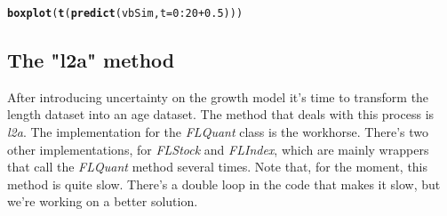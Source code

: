 \documentclass[a4paper,english,10pt]{article}\usepackage[]{graphicx}\usepackage[]{color}
\makeatletter
\newcommand{\hlnum}[1]{\textcolor[rgb]{0.686,0.059,0.569}{#1}}%
\newcommand{\hlopt}[1]{\textcolor[rgb]{0,0,0}{#1}}%
\newcommand{\hlstd}[1]{\textcolor[rgb]{0.345,0.345,0.345}{#1}}%
\newcommand{\hlkwc}[1]{\textcolor[rgb]{0.333,0.667,0.333}{#1}}%
\newcommand{\hlkwd}[1]{\textcolor[rgb]{0.737,0.353,0.396}{\textbf{#1}}}%
\newenvironment{kframe}{%
 \def\at@end@of@kframe{}%
 \ifinner\ifhmode%
  \def\at@end@of@kframe{\end{minipage}}%
  \begin{minipage}{\columnwidth}%
 \fi\fi%
 \def\FrameCommand##1{\hskip\@totalleftmargin \hskip-\fboxsep
 \colorbox{shadecolor}{##1}\hskip-\fboxsep
     \hskip-\linewidth \hskip-\@totalleftmargin \hskip\columnwidth}%
 \MakeFramed {\advance\hsize-\width
   \@totalleftmargin\z@ \linewidth\hsize
   \@setminipage}}%
 {\par\unskip\endMakeFramed%
 \at@end@of@kframe}
\newenvironment{knitrout}{}{} %
\makeatother
\begin{document}
\begin{knitrout}
\color{fgcolor}\begin{kframe}
\begin{alltt}
\hlkwd{boxplot}\hlstd{(}\hlkwd{t}\hlstd{(}\hlkwd{predict}\hlstd{(vbSim,} \hlkwc{t} \hlstd{=} \hlnum{0}\hlopt{:}\hlnum{20} \hlopt{+} \hlnum{0.5}\hlstd{)))}
\end{alltt}


{\ttfamily\noindent\bfseries\color{errorcolor}{\#\# Error: error in evaluating the argument 'x' in selecting a method for function 't': Error in predict(vbSim, t = 0:20 + 0.5) : \\\#\#\ \  error in evaluating the argument 'object' in selecting a method for function 'predict': Error: object 'vbSim' not found}}\end{kframe}
\end{knitrout}


\subsection{The "l2a" method}

After introducing uncertainty on the growth model it's time to transform the length dataset into an age dataset. The method that deals with this process is \emph{l2a}. The implementation for the \emph{FLQuant} class is the workhorse. There's two other implementations, for \emph{FLStock} and \emph{FLIndex}, which are mainly wrappers that call the \emph{FLQuant} method several times. Note that, for the moment, this method is quite slow. There's a double loop in the code that makes it slow, but we're working on a better solution.
\end{document}
